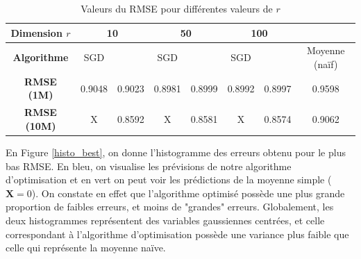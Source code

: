 \documentclass[10pt,a4paper]{article}
\begin{document}
\begin{table}[h]
\begin{center}
   \begin{tabular}{|c|c|c|c|c|c|c|c|}
  	\hline
  	\textbf{Dimension $r$} & \multicolumn{2}{c|}{10} & \multicolumn{2}{c|}{50} & \multicolumn{2}{c|}{100}& \\
  	\hline
  	\textbf{Algorithme} & SGD & \jel & SGD & \jel & SGD & \jel & Moyenne (naïf) \\
  	\hline
  	\textbf{RMSE (1M)}  & 0.9048  & 0.9023 & 0.8981 & 0.8999 & 0.8992 & 0.8997 & 0.9598\\
  	\hline
  	\textbf{RMSE (10M)}  & X  & 0.8592 & X & 0.8581 & X & 0.8574 & 0.9062\\
  	\hline
\end{tabular}
\end{center}
\caption{\label{RMSE_vs_r} Valeurs du RMSE pour différentes valeurs de $r$}
\end{table}

En Figure \ref{histo_best}, on donne l'histogramme des erreurs obtenu pour le plus bas RMSE. En bleu, on visualise les prévisions de notre algorithme d'optimisation et en vert on peut voir les prédictions de la moyenne simple ($\textbf{X}=0$). On constate en effet que l'algorithme optimisé possède une plus grande proportion de faibles erreurs, et moins de "grandes" erreurs. Globalement, les deux histogrammes représentent des variables gaussiennes centrées, et celle correspondant à l'algorithme d'optimisation possède une variance plus faible que celle qui représente la moyenne naïve.




\end{document}
